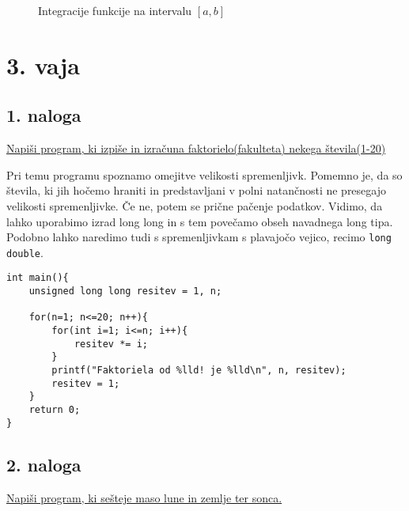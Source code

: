 \documentclass[a4paper, 12pt]{article}
\begin{document}
\begin{figure}[!htbp]
	\centering
	\caption{Integracije funkcije na intervalu $[a, b]$}
\end{figure}
	
\section*{3. vaja}
\subsection*{1. naloga}

\underline{Napiši program, ki izpiše in izračuna faktorielo(fakulteta) nekega števila(1-20)}\

Pri temu programu spoznamo omejitve velikosti spremenljivk. Pomemno je, da so števila, ki jih hočemo hraniti in predstavljani v polni natančnosti ne presegajo velikosti spremenljivke. Če ne, potem se prične pačenje podatkov. Vidimo, da lahko uporabimo izrad long long in s tem povečamo obseh navadnega long tipa. Podobno lahko naredimo tudi s spremenljivkam s plavajočo vejico, recimo \lstinline|long double|.

\pagebreak

\begin{lstlisting}
int main(){
	unsigned long long resitev = 1, n;

	for(n=1; n<=20; n++){
		for(int i=1; i<=n; i++){
			resitev *= i;
		}
		printf("Faktoriela od %lld! je %lld\n", n, resitev);
		resitev = 1;
	}
	return 0;
}
\end{lstlisting}

\subsection*{2. naloga}
	
\underline{Napiši program, ki sešteje maso lune in zemlje ter sonca.}\
\end{document}
